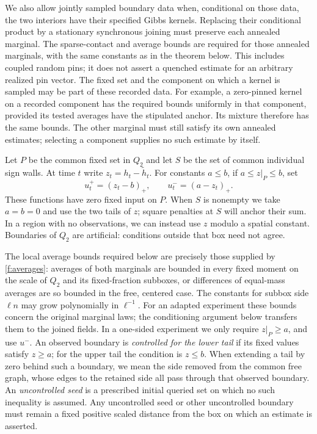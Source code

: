 We also allow jointly sampled boundary data when, conditional on those
data, the two interiors have their specified Gibbs kernels. Replacing
their conditional product by a stationary synchronous joining must
preserve each annealed marginal. The sparse-contact and average bounds
are required for those annealed marginals, with the same constants as
in the theorem below. This includes coupled random pins; it does not
assert a quenched estimate for an arbitrary realized pin vector.
The fixed set and the component on which a kernel is sampled may be
part of these recorded data. For example, a zero-pinned kernel on a
recorded component has the required bounds uniformly in that component,
provided its tested averages have the stipulated anchor. Its mixture
therefore has the same bounds. The other marginal must still satisfy
its own annealed estimates; selecting a component supplies no such
estimate by itself.

Let $P$ be the common fixed set in $Q_2$ and let $S$ be the set of common
individual sign walls. At time $t$ write $z_t=h_t-\widetilde h_t$.
For constants $a\le b$, if $a\le z|_P\le b$, set
\begin{equation}\label{c:tails}
 u^+_t=(z_t-b)_+,\qquad u^-_t=(a-z_t)_+.
\end{equation}
These functions have zero fixed input on $P$. When $S$ is nonempty we
take $a=b=0$ and use the two tails of $z$; square penalties at $S$ will
anchor their sum. In a region with no observations, we can instead use
$z$ modulo a spatial constant. Boundaries of $Q_2$ are artificial:
conditions outside that box need not agree.

The local average bounds required below are precisely those supplied by
\ref{f:averages}: averages of both marginals are bounded in every fixed
moment on the scale of $Q_2$ and its fixed-fraction subboxes, or differences
of equal-mass averages are so bounded in the free, centered case. The
constants for subbox side $\ell n$ may grow polynomially in $\ell^{-1}$.
For an adapted experiment these bounds concern the original marginal
laws; the conditioning argument below transfers them to the joined fields.
In a one-sided experiment we only require $z|_P\ge a$, and use $u^-$. An
observed boundary is \emph{controlled for the lower tail} if its fixed
values satisfy $z\ge a$; for the upper tail the condition is $z\le b$.
When extending a tail by zero behind such a boundary, we mean the side
removed from the common free graph, whose edges to the retained side
all pass through that observed boundary. An \emph{uncontrolled seed}
is a prescribed initial queried set on which no such inequality is
assumed. Any uncontrolled seed or other uncontrolled boundary must
remain a fixed positive scaled distance from the box on which an
estimate is asserted.

